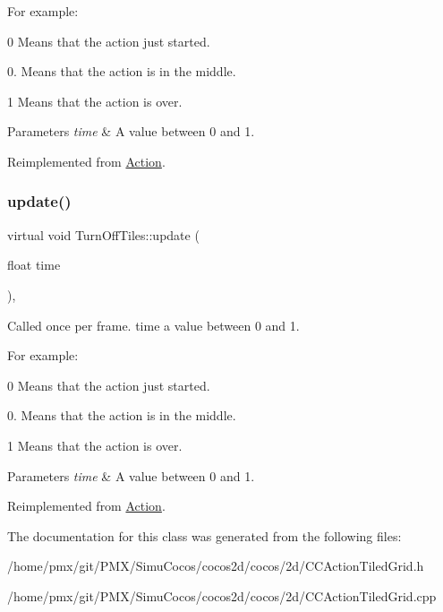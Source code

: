 For example\+:
\begin{DoxyItemize}
\item 0 Means that the action just started.
\item 0. Means that the action is in the middle.
\item 1 Means that the action is over.
\end{DoxyItemize}


\begin{DoxyParams}{Parameters}
{\em time} & A value between 0 and 1. \\
\hline
\end{DoxyParams}


Reimplemented from \hyperlink{classAction_a937e646e63915e33ad05ba149bfcf239}{Action}.

\mbox{\label{classTurnOffTiles_a138edd4a33ea3e211cf2f5aa495c4138}} 
\subsubsection{\texorpdfstring{update()}{update()}\hspace{0.1cm}{\footnotesize\ttfamily [2/2]}}
{\footnotesize\ttfamily virtual void Turn\+Off\+Tiles\+::update (\begin{DoxyParamCaption}\item[{float}]{time }\end{DoxyParamCaption})\hspace{0.3cm}{\ttfamily [override]}, {\ttfamily [virtual]}}

Called once per frame. time a value between 0 and 1.

For example\+:
\begin{DoxyItemize}
\item 0 Means that the action just started.
\item 0. Means that the action is in the middle.
\item 1 Means that the action is over.
\end{DoxyItemize}


\begin{DoxyParams}{Parameters}
{\em time} & A value between 0 and 1. \\
\hline
\end{DoxyParams}


Reimplemented from \hyperlink{classAction_a937e646e63915e33ad05ba149bfcf239}{Action}.



The documentation for this class was generated from the following files\+:\begin{DoxyCompactItemize}
\item 
/home/pmx/git/\+P\+M\+X/\+Simu\+Cocos/cocos2d/cocos/2d/C\+C\+Action\+Tiled\+Grid.\+h\item 
/home/pmx/git/\+P\+M\+X/\+Simu\+Cocos/cocos2d/cocos/2d/C\+C\+Action\+Tiled\+Grid.\+cpp\end{DoxyCompactItemize}
